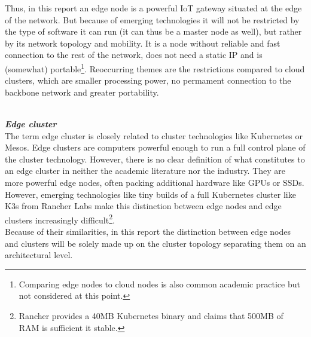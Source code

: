 Thus, in this report an edge node is a powerful IoT gateway situated at the edge of the network. But because of emerging technologies it will not be restricted by the type of software it can run (it can thus be a master node as well), but rather by its network topology and mobility. It is a node without reliable and fast connection to the rest of the network, does not need a static IP and is (somewhat) portable\footnote{Comparing edge nodes to cloud nodes is also common academic practice\cite{contstraintDevicesTerminology}  but not considered at this point.}.
Reoccurring themes are the restrictions compared to cloud clusters, which are smaller processing power,
no permament connection to the backbone network and greater portability.

\vspace{0.5mm}\\
\textbf\textit{Edge cluster}\\
The term edge cluster is closely related to cluster technologies like Kubernetes or Mesos.
Edge clusters are computers powerful enough to run a full control plane of the cluster technology.
However, there is no clear definition of what constitutes to an edge cluster in neither the academic literature nor the industry.
They are more powerful edge nodes, often packing additional hardware like GPUs or SSDs.
However, emerging technologies like tiny builds of a full Kubernetes cluster
like K3s from Rancher Labs\cite{k3sLight14:online} make this distinction between edge nodes and edge clusters
increasingly difficult\footnote{Rancher provides a  40MB Kubernetes binary and claims that 500MB of RAM is sufficient it stable.}.\\
Because of their similarities, in this report the distinction between edge nodes and clusters will be solely
made up on the cluster topology separating them on an architectural level.

